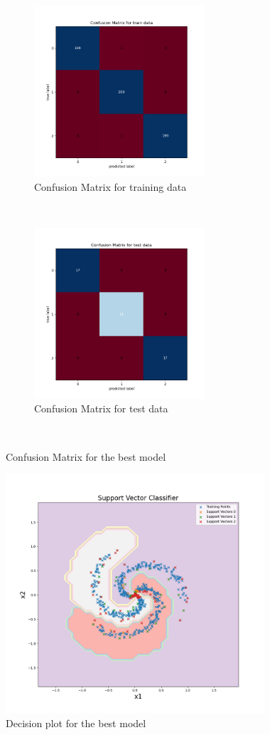\begin{figure}[!ht]
    \centering
    \begin{subfigure}[t]{0.5\textwidth}
        \centering
        \includegraphics[height=2.5in]{Dataset_1b/SVM/SVC_Gaussian_cmatrix_train_data.png}
        \caption{Confusion Matrix for training data}
    \end{subfigure}%
    ~ 
    \begin{subfigure}[t]{0.5\textwidth}
        \centering
        \includegraphics[height=2.5in]{Dataset_1b/SVM/SVC_Gaussian_cmatrix_test_data.png}
        \caption{Confusion Matrix for test data}
    \end{subfigure}%
    ~
    \caption{Confusion Matrix for the best model}
    \label{fig:13}
\end{figure}

\begin{figure}[!ht]
    \centering
    \includegraphics[height=3.5in]{Dataset_1b/SVM/SVC_Gaussian.png}
    \caption{Decision plot for the best model}
    \label{fig:14}
\end{figure}



